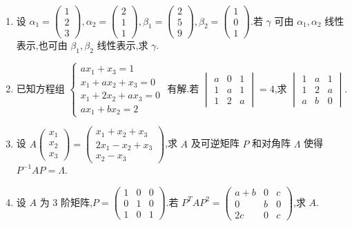 \begin{enumerate}
	\item 设 $\alpha_1 = \begin{pmatrix} 1 \\ 2 \\ 3 \end{pmatrix}, \alpha_2 = \begin{pmatrix} 2 \\ 1 \\ 1 \end{pmatrix}, \beta_1 = \begin{pmatrix} 2 \\ 5 \\ 9 \end{pmatrix}, \beta_2 = \begin{pmatrix} 1 \\ 0 \\ 1 \end{pmatrix}$.若 $\gamma$ 可由 $\alpha_1, \alpha_2$ 线性表示,也可由 $\beta_1, \beta_2$ 线性表示,求 $\gamma$.
	
	\item 已知方程组 $\begin{cases} ax_1 + x_3 = 1 \\ x_1 + ax_2 + x_3 = 0 \\ x_1 + 2x_2 + ax_3 = 0 \\ ax_1 + bx_2 = 2 \end{cases}$ 有解.若 $\begin{vmatrix} a & 0 & 1 \\ 1 & a & 1 \\ 1 & 2 & a \end{vmatrix} = 4$,求 $\begin{vmatrix} 1 & a & 1 \\ 1 & 2 & a \\ a & b & 0 \end{vmatrix}$.
	
	\item 设 $A \begin{pmatrix} x_1 \\ x_2 \\ x_3 \end{pmatrix} = \begin{pmatrix} x_1 + x_2 + x_3 \\ 2x_1 - x_2 + x_3 \\ x_2 - x_3 \end{pmatrix}$,求 $A$ 及可逆矩阵 $P$ 和对角阵 $\Lambda$ 使得 $P^{-1}AP = \Lambda$.
	
	\item 设 $A$ 为 3 阶矩阵,$P = \begin{pmatrix} 1 & 0 & 0 \\ 0 & 1 & 0 \\ 1 & 0 & 1 \end{pmatrix}$.若 $P^T A P^2 = \begin{pmatrix} a+b & 0 & c \\ 0 & b & 0 \\ 2c & 0 & c \end{pmatrix}$,求 $A$.
	

\end{enumerate}
